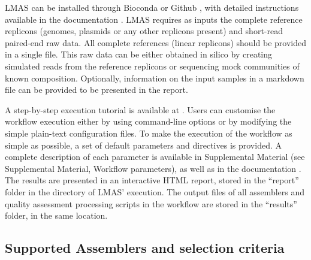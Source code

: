 LMAS can be installed through Bioconda \cite{noauthor_lmas_nodate} or Github \cite{mendes_lmas_2021}, with detailed instructions available in the documentation \cite{noauthor_installation_nodate}. LMAS requires as inputs the complete reference replicons (genomes, plasmids or any other replicons present) and short-read paired-end raw data. All complete references (linear replicons) should be provided in a single file. This raw data can be either obtained in silico by creating simulated reads from the reference replicons or sequencing mock communities of known composition. Optionally, information on the input samples in a markdown file can be provided to be presented in the report.

A step-by-step execution tutorial is available at \cite{noauthor_basic_nodate}. Users can customise the workflow execution either by using command-line options or by modifying the simple plain-text configuration files. To make the execution of the workflow as simple as possible, a set of default parameters and directives is provided. A complete description of each parameter is available in Supplemental Material (see Supplemental Material, Workflow parameters), as well as in the documentation \cite{noauthor_parameters_nodate}.  The results are presented in an interactive HTML report, stored in the “report” folder in the directory of LMAS’ execution. The output files of all assemblers and quality assessment processing scripts in the workflow are stored in the “results” folder, in the same location. 

\subsection{Supported Assemblers and selection criteria}

